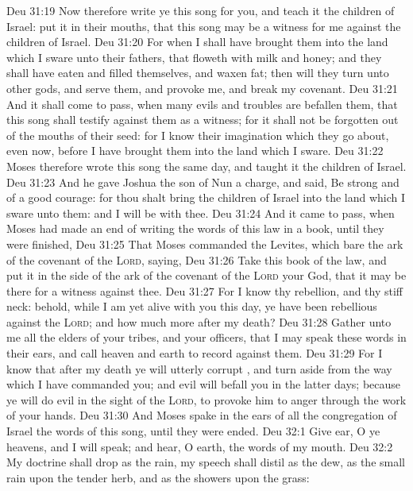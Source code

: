 \vs Deu 31:19 Now therefore write ye this song for you, and teach it the children of Israel: put it in their mouths, that this song may be a witness for me against the children of Israel.
\vs Deu 31:20 For when I shall have brought them into the land which I sware unto their fathers, that floweth with milk and honey; and they shall have eaten and filled themselves, and waxen fat; then will they turn unto other gods, and serve them, and provoke me, and break my covenant.
\vs Deu 31:21 And it shall come to pass, when many evils and troubles are befallen them, that this song shall testify against them as a witness; for it shall not be forgotten out of the mouths of their seed: for I know their imagination which they go about, even now, before I have brought them into the land which I sware.
\vs Deu 31:22 Moses therefore wrote this song the same day, and taught it the children of Israel.
\vs Deu 31:23 And he gave Joshua the son of Nun a charge, and said, Be strong and of a good courage: for thou shalt bring the children of Israel into the land which I sware unto them: and I will be with thee.
\vs Deu 31:24 And it came to pass, when Moses had made an end of writing the words of this law in a book, until they were finished,
\vs Deu 31:25 That Moses commanded the Levites, which bare the ark of the covenant of the \textsc{Lord}, saying,
\vs Deu 31:26 Take this book of the law, and put it in the side of the ark of the covenant of the \textsc{Lord} your God, that it may be there for a witness against thee.
\vs Deu 31:27 For I know thy rebellion, and thy stiff neck: behold, while I am yet alive with you this day, ye have been rebellious against the \textsc{Lord}; and how much more after my death?
\vs Deu 31:28 Gather unto me all the elders of your tribes, and your officers, that I may speak these words in their ears, and call heaven and earth to record against them.
\vs Deu 31:29 For I know that after my death ye will utterly corrupt , and turn aside from the way which I have commanded you; and evil will befall you in the latter days; because ye will do evil in the sight of the \textsc{Lord}, to provoke him to anger through the work of your hands.
\vs Deu 31:30 And Moses spake in the ears of all the congregation of Israel the words of this song, until they were ended.
\vs Deu 32:1 Give ear, O ye heavens, and I will speak; and hear, O earth, the words of my mouth.
\vs Deu 32:2 My doctrine shall drop as the rain, my speech shall distil as the dew, as the small rain upon the tender herb, and as the showers upon the grass:
